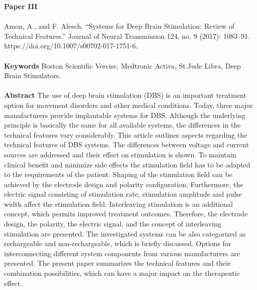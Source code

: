 
\textbf{Paper III} 
\\ \\
\noindent
Amon, A., and F. Alesch. “Systems for Deep Brain Stimulation: Review of Technical Features.” Journal of Neural Transmission 124, no. 9 (2017): 1083–91. https://doi.org/10.1007/s00702-017-1751-6. \\ \\

\noindent
\textbf{Keywords} Boston Scientific Vercise, Medtronic Activa, St.Jude Libra, Deep Brain Stimulators.  \\ \\

\noindent
\textbf{Abstract} The use of deep brain stimulation (DBS) is an important treatment option for movement disorders and other medical conditions. Today, three major manufacturers provide implantable systems for DBS. Although the underlying principle is basically the same for all available systems, the differences in the technical features vary considerably. This article outlines aspects regarding the technical features of DBS systems. The differences between voltage and current sources are addressed and their effect on stimulation is shown. To maintain clinical benefit and minimize side effects the stimulation field has to be adapted to the requirements of the patient. Shaping of the stimulation field can be achieved by the electrode design and polarity configuration. Furthermore, the electric signal consisting of stimulation rate, stimulation amplitude and pulse width affect the stimulation field. Interleaving stimulation is an additional concept, which permits improved treatment outcomes. Therefore, the electrode design, the polarity, the electric signal, and the concept of interleaving stimulation are presented. The investigated systems can be also categorized as rechargeable and non-rechargeable, which is briefly discussed. Options for interconnecting different system components from various manufacturers are presented. The present paper summarizes the technical features and their combination possibilities, which can have a major impact on the therapeutic effect. \\ \\

